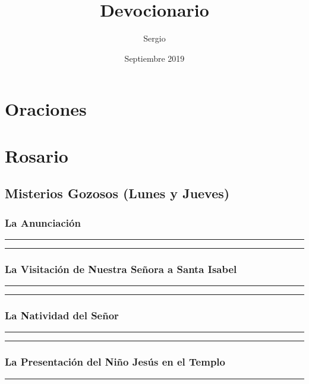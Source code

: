 \documentclass[11pt,a4paper]{report}
\title{Devocionario}
\author{Sergio}
\date{Septiembre 2019}
\begin{document}
\maketitle

\section*{Oraciones}


\section*{Rosario}
\subsection*{Misterios Gozosos (Lunes y Jueves)}
\subsubsection*{La Anunciación}


\rule{\textwidth}{0.5pt}

\rule{\textwidth}{0.5pt}


\subsubsection*{La Visitación de Nuestra Señora a Santa Isabel}


\rule{\textwidth}{0.5pt}

\rule{\textwidth}{0.5pt}


\subsubsection*{La Natividad del Señor}


\rule{\textwidth}{0.5pt}

\rule{\textwidth}{0.5pt}


\subsubsection*{La Presentación del Niño Jesús en el Templo}


\rule{\textwidth}{0.5pt}
\end{document}
